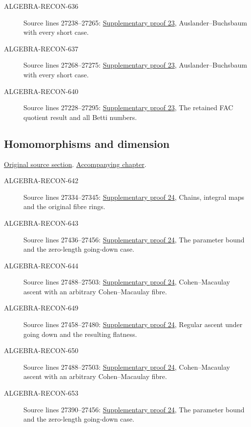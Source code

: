 \begin{description}
\item[ALGEBRA-RECON-636] Source lines 27238--27265: \hyperlink{algebra_regular_ab_notes_20260928}{Supplementary proof 23}, Auslander–Buchsbaum with every short case.
\item[ALGEBRA-RECON-637] Source lines 27268--27275: \hyperlink{algebra_regular_ab_notes_20260928}{Supplementary proof 23}, Auslander–Buchsbaum with every short case.
\item[ALGEBRA-RECON-640] Source lines 27228--27295: \hyperlink{algebra_regular_ab_notes_20260928}{Supplementary proof 23}, The retained FAC quotient result and all Betti numbers.
\end{description}

\subsection{Homomorphisms and dimension}
\hypertarget{algebra-source-section-homomorphism-dimension}{}
\noindent\href{https://github.com/stacks/stacks-project/blob/a04446e57ec1fbc252a871afcec7752fb2807b14/algebra.tex\#L27305}{Original source section}. \href{algebra.pdf\#nameddest=section-homomorphism-dimension}{Accompanying chapter}.

\begin{description}
\item[ALGEBRA-RECON-642] Source lines 27334--27345: \hyperlink{algebra_dimension_maps_notes_20260928}{Supplementary proof 24}, Chains, integral maps and the original fibre rings.
\item[ALGEBRA-RECON-643] Source lines 27436--27456: \hyperlink{algebra_dimension_maps_notes_20260928}{Supplementary proof 24}, The parameter bound and the zero-length going-down case.
\item[ALGEBRA-RECON-644] Source lines 27488--27503: \hyperlink{algebra_dimension_maps_notes_20260928}{Supplementary proof 24}, Cohen–Macaulay ascent with an arbitrary Cohen–Macaulay fibre.
\item[ALGEBRA-RECON-649] Source lines 27458--27480: \hyperlink{algebra_dimension_maps_notes_20260928}{Supplementary proof 24}, Regular ascent under going down and the resulting flatness.
\item[ALGEBRA-RECON-650] Source lines 27488--27503: \hyperlink{algebra_dimension_maps_notes_20260928}{Supplementary proof 24}, Cohen–Macaulay ascent with an arbitrary Cohen–Macaulay fibre.
\item[ALGEBRA-RECON-653] Source lines 27390--27456: \hyperlink{algebra_dimension_maps_notes_20260928}{Supplementary proof 24}, The parameter bound and the zero-length going-down case.
\end{description}

